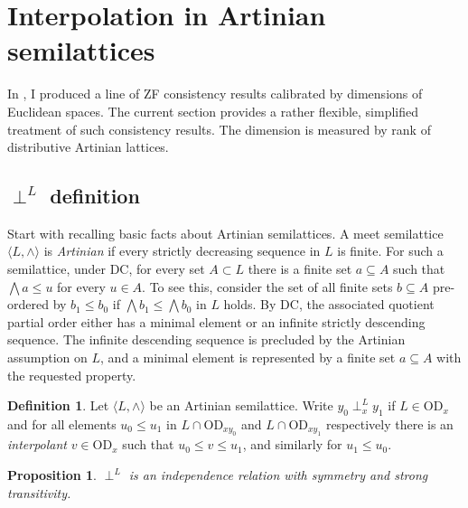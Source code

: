 \documentclass{article}
\newcommand{\vd}{\mathrm{OD}}
\newtheorem{proposition}[theorem]{Proposition}
\theoremstyle{definition}
\newtheorem{definition}[theorem]{Definition}
\begin{document}
\section{Interpolation in Artinian semilattices}
\label{artiniansection}

In \cite{z:triangles, z:krull}, I produced a line of ZF consistency results calibrated by dimensions of Euclidean spaces. The current section provides a rather flexible, simplified treatment of such consistency results. The dimension is measured by rank of distributive Artinian lattices.

\subsection{$\perp^L$ definition}

Start with recalling basic facts about Artinian semilattices. A meet semilattice $\langle L, \land\rangle$ is \emph{Artinian} if every strictly decreasing sequence in $L$ is finite. For such a semilattice, under DC, for every set $A\subset L$ there is a finite set $a\subseteq A$ such that $\bigwedge a\leq u$ for every $u\in A$. To see this, consider the set of all finite sets $b\subseteq A$ pre-ordered by $b_1\leq b_0$ if $\bigwedge b_1\leq\bigwedge b_0$ in $L$ holds. By DC, the associated quotient partial order either has a minimal element or an infinite strictly descending sequence. The infinite descending sequence is precluded by the Artinian assumption on $L$, and a minimal element is represented by a finite set $a\subseteq A$ with the requested property.

\begin{definition}
Let $\langle L, \land\rangle$ be an Artinian semilattice. Write $y_0\perp^L_xy_1$ if $L\in\vd_x$ and for all elements $u_0\leq u_1$ in $L\cap\vd_{xy_0}$ and $L\cap\vd_{xy_1}$ respectively there is an \emph{interpolant} $v\in \vd_x$ such that $u_0\leq v\leq u_1$, and similarly for $u_1\leq u_0$.
\end{definition}

\begin{proposition}
\label{alg}
$\perp^L$ is an independence relation with symmetry and strong transitivity.
\end{proposition}
\end{document}

